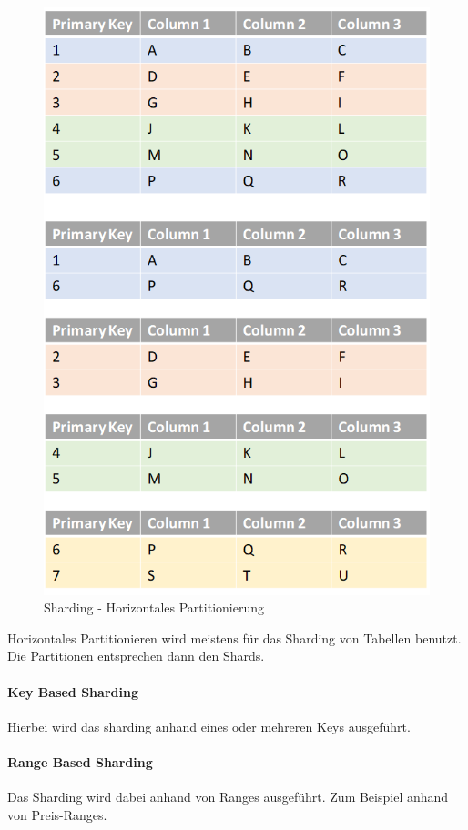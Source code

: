 \begin{flushleft}
\begin{figure}[H]
        \includegraphics[width=0.8\linewidth]{source/implementation/evaluation/excursus_architecture/sharding_horizontal_partitioning}
        \caption{Sharding - Horizontales Partitionierung}
        \label{fig:sharding_horizontal_partitioning}
    \end{figure}
    Horizontales Partitionieren wird meistens für das Sharding von Tabellen benutzt.
    Die Partitionen entsprechen dann den Shards.
\begin{flushleft}
\end{flushleft}
    \paragraph{Key Based Sharding}
    Hierbei wird das sharding anhand eines oder mehreren Keys ausgeführt.
\begin{flushleft}
\end{flushleft}
    \paragraph{Range Based Sharding}
    Das Sharding wird dabei anhand von Ranges ausgeführt.
    Zum Beispiel anhand von Preis-Ranges.
\begin{flushleft}
\end{flushleft}

\end{flushleft}
